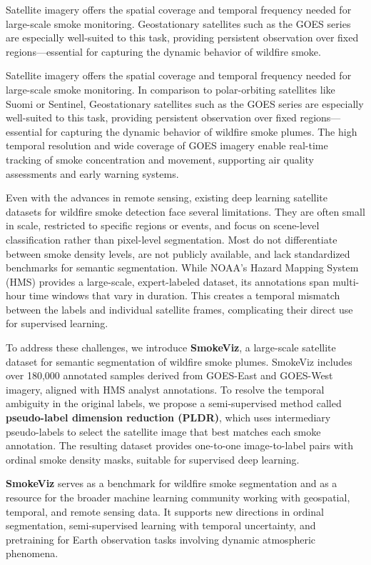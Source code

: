 \documentclass{article}
\begin{document}
Satellite imagery offers the spatial coverage and temporal frequency needed for large-scale smoke monitoring. Geostationary satellites such as the GOES series \cite{goes} are especially well-suited to this task, providing persistent observation over fixed regions—essential for capturing the dynamic behavior of wildfire smoke. 

Satellite imagery offers the spatial coverage and temporal frequency needed for large-scale smoke monitoring. In comparison to polar-orbiting satellites like Suomi or Sentinel, Geostationary satellites such as the GOES series \cite{goes} are especially well-suited to this task, providing persistent observation over fixed regions—essential for capturing the dynamic behavior of wildfire smoke plumes. The high temporal resolution and wide coverage of GOES imagery enable real-time tracking of smoke concentration and movement, supporting air quality assessments and early warning systems.

Even with the advances in remote sensing, existing deep learning satellite datasets for wildfire smoke detection face several limitations. They are often small in scale, restricted to specific regions or events, and focus on scene-level classification rather than pixel-level segmentation. Most do not differentiate between smoke density levels, are not publicly available, and lack standardized benchmarks for semantic segmentation. While NOAA’s Hazard Mapping System (HMS) provides a large-scale, expert-labeled dataset, its annotations span multi-hour time windows that vary in duration. This creates a temporal mismatch between the labels and individual satellite frames, complicating their direct use for supervised learning.

To address these challenges, we introduce \textbf{SmokeViz}, a large-scale satellite dataset for semantic segmentation of wildfire smoke plumes. SmokeViz includes over 180,000 annotated samples derived from GOES-East and GOES-West imagery, aligned with HMS analyst annotations. To resolve the temporal ambiguity in the original labels, we propose a semi-supervised method called \textbf{pseudo-label dimension reduction (PLDR)}, which uses intermediary pseudo-labels to select the satellite image that best matches each smoke annotation. The resulting dataset provides one-to-one image-to-label pairs with ordinal smoke density masks, suitable for supervised deep learning.

\textbf{SmokeViz} serves as a benchmark for wildfire smoke segmentation and as a resource for the broader machine learning community working with geospatial, temporal, and remote sensing data. It supports new directions in ordinal segmentation, semi-supervised learning with temporal uncertainty, and pretraining for Earth observation tasks involving dynamic atmospheric phenomena.
\end{document}
